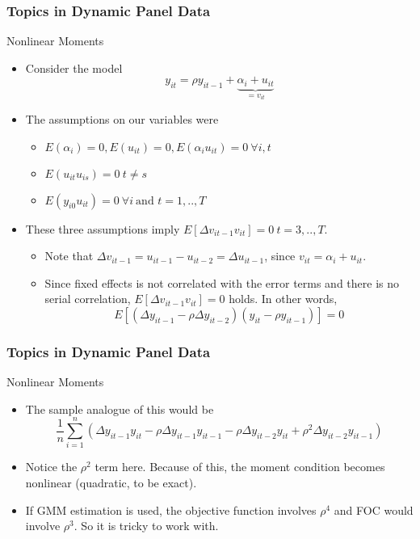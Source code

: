 \documentclass{beamer}
\begin{document}
\begin{frame}
\frametitle{Topics in Dynamic Panel Data}
Nonlinear Moments
\begin{itemize}
\item Consider the model
\[
y_{it}=\rho y_{it-1}+\underbrace{\alpha_i +u_{it}}_{=v_{it}} 
\]
\item The assumptions on our variables were
\begin{itemize}
\item $E(\alpha_i)=0, E(u_{it})=0, E(\alpha_i u_{it})=0 \ \forall i,t$
\item $E(u_{it}u_{is})=0\  t\neq s$
\item $E(y_{i0}u_{it})=0 \ \forall i \ \text{and }t=1,..,T$
\end{itemize}
\item These three assumptions imply $E[\Delta v_{it-1}v_{it}]=0 \ t=3,..,T$. 
\begin{itemize}
\item Note that $\Delta v_{it-1}= u_{it-1}-u_{it-2}=\Delta u_{it-1}$, since $v_{it}=\alpha_i + u_{it}$.
\item Since fixed effects is not correlated with the error terms and there is no serial correlation, $E[\Delta v_{it-1}v_{it}]=0$ holds. In other words, 
\[
E[(\Delta y_{it-1}-\rho\Delta y_{it-2})(y_{it}-\rho y_{it-1})]=0
\]
\end{itemize}
\end{itemize}
\end{frame}

\begin{frame}
\frametitle{Topics in Dynamic Panel Data}
Nonlinear Moments
\begin{itemize}
\item The sample analogue of this would be
\[
\frac{1}{n}\sum_{i=1}^n (\Delta y_{it-1}y_{it}-\rho\Delta y_{it-1}y_{it-1}-\rho \Delta y_{it-2}y_{it}+\rho^2\Delta y_{it-2}y_{it-1})
\]
\item Notice the $\rho^2$ term here. Because of this, the moment condition becomes nonlinear (quadratic, to be exact).
\item  If GMM estimation is used, the objective function involves $\rho^4$ and FOC would involve $\rho^3$. So it is tricky to work with.
\end{itemize}
\end{frame}
\end{document}
